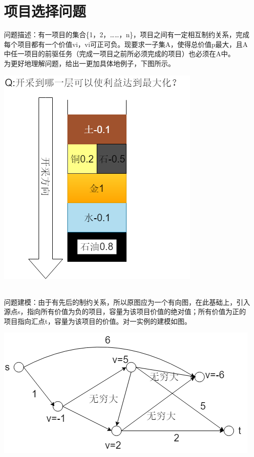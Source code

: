 \section{项目选择问题}
问题描述：有一项目的集合\{1，2，……，n\}，项目之间有一定相互制约关系，完成每个项目都有一个价值vi，vi可正可负。现要求一子集A，使得总价值p最大，且A中任一项目的前驱任务（完成一项目之前所必须完成的项目）也必须在A中。
\\为更好地理解问题，给出一更加具体地例子，下图所示。\\
\centerline{\includegraphics[scale=0.6]{Ln11.image/networkflow8.png}}
\\问题建模：由于有先后的制约关系，所以原图应为一个有向图，在此基础上，引入源点s，指向所有价值为负的项目，容量为该项目价值的绝对值；所有价值为正的项目指向汇点t，容量为该项目的价值。对一实例的建模如图。\\
\centerline{\includegraphics[scale=0.6]{Ln11.image/networkflow9.png}}

